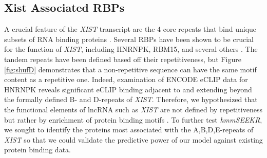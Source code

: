 \subsection{Xist Associated RBPs}
A crucial feature of the \emph{XIST} transcript are the 4 core repeats that bind unique subsets of RNA binding proteins \cite{Sunwoo2017RepeatCIZ1,Zhao2008PolycombChromosome,Pintacuda2017HnRNPKSilencing,Wang2017TargetingGuanines,Hoki2009AMouse}. Several RBPs have been shown to be crucial for the function of \emph{XIST}, including HNRNPK, RBM15, and several others \cite{Sunwoo2017RepeatCIZ1,Zhao2008PolycombChromosome,Pintacuda2017HnRNPKSilencing,Wang2017TargetingGuanines,Hoki2009AMouse,Chu2015SystematicProteins}. The tandem repeats have been defined based off their repetitiveness, but Figure \ref{fig:shufD} demonstrates that a non-repetitive sequence can have the same motif content as a repetitive one. Indeed, examination of ENCODE eCLIP data for HNRNPK reveals significant eCLIP binding adjacent to and extending beyond the formally defined B- and D-repeats of \emph{XIST}. Therefore, we hypothesized that the functional elements of lncRNA such as \emph{XIST} are not defined by repetitiveness but rather by enrichment of protein binding motifs \cite{Kirk2018FunctionalContent,Sprague2019NonlinearDomains,Dominguez2018SequenceProteins,Ray2013ARegulation,Wang2017TargetingGuanines}. To further test \emph{hmmSEEKR}, we sought to identify the proteins most associated with the A,B,D,E-repeats of \emph{XIST} so that we could validate the predictive power of our model against existing protein binding data.
